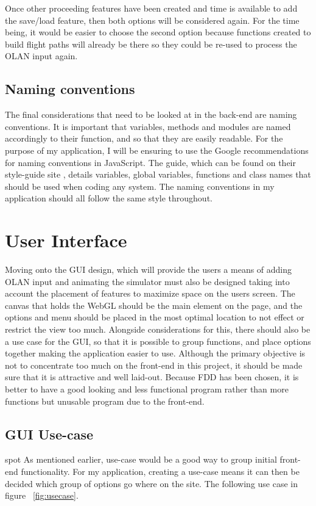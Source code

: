 Once other proceeding features have been created and time is available to add the save/load feature, then both options will be considered again. For the time being, it would be easier to choose the second option because functions created to build flight paths will already be there so they could be re-used to process the OLAN input again.

\clearpage

\subsection{Naming conventions}
The final considerations that need to be looked at in the back-end are naming conventions. It is important that variables, methods and modules are named accordingly to their function, and so that they are easily readable. For the purpose of my application, I will be ensuring to use the Google recommendations for naming conventions in JavaScript. The guide, which can be found on their style-guide site \cite{google_javascript}, details variables, global variables, functions and class names that should be used when coding any system. The naming conventions in my application should all follow the same style throughout.

\section{User Interface}
Moving onto the GUI design, which will provide the users a means of adding OLAN input and animating the simulator must also be designed taking into account the placement of features to maximize space on the users screen. The canvas that holds the WebGL should be the main element on the page, and the options and menu should be placed in the most optimal location to not effect or restrict the view too much. Alongside considerations for this, there should also be a use case for the GUI, so that it is possible to group functions, and place options together making the application easier to use. Although the primary objective is not to concentrate too much on the front-end in this project, it should be made sure that it is attractive and well laid-out. Because FDD has been chosen, it is better to have a good looking and less functional program rather than more functions but unusable program due to the front-end.

\subsection{GUI Use-case}spot
As mentioned earlier, use-case would be a good way to group initial front-end functionality. For my application, creating a use-case means it can then be decided which group of options go where on the site. The following use case in figure ~\ref{fig:usecase}.

